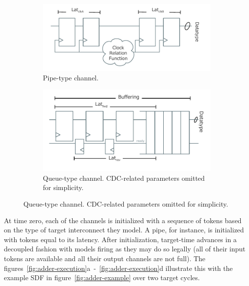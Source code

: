 \begin{figure}
    \centering
    \begin{subfigure}[t]{0.48\textwidth}
        \includegraphics[width=\textwidth]{figures/pipe.pdf}
        \caption{Pipe-type channel.}
        \label{fig:pipe}
    \end{subfigure}\hspace{0.5cm}
    \begin{subfigure}[t]{0.48\textwidth}
        \includegraphics[width=\textwidth]{figures/queue.pdf}
        \caption{Queue-type channel. CDC-related parameters omitted for simplicity.}
        \label{fig:queue}
    \end{subfigure}
\end{figure}

At time zero, each of the channels is initialized with a sequence of tokens
based on the type of target interconnect they model. A pipe, for instance, is
initialized with tokens equal to its latency. After initialization, target-time
advances in a decoupled fashion with models firing as they may do so legally
(all of their input tokens are available and all their output channels are not
full). The figures~\ref{fig:adder-execution}a~-~\ref{fig:adder-execution}d
illustrate this with the example SDF in figure~\ref{fig:adder-example} over two
target cycles.

